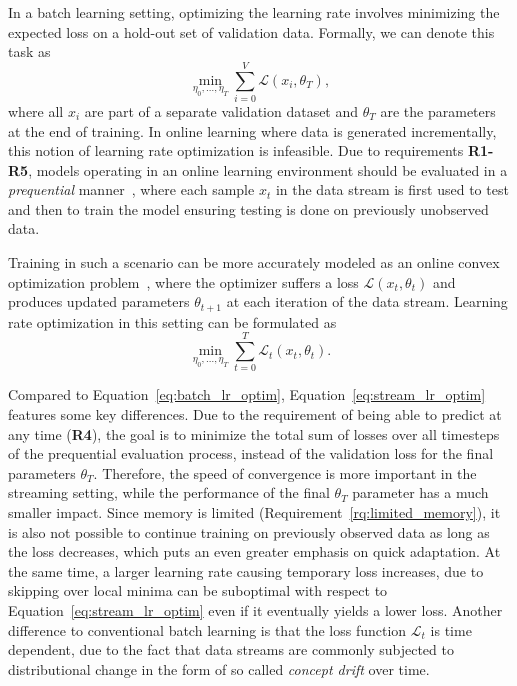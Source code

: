 \documentclass[runningheads]{llncs}
\begin{document}
In a batch learning setting, optimizing the learning rate involves minimizing the expected loss on a hold-out set of validation data.
Formally, we can denote this task as
\begin{equation}
	\label{eq:batch_lr_optim}
	\min_{\eta_0, \ldots, \eta_T} \sum_{i=0}^V \mathcal{L}(x_i, \theta_T),
\end{equation}
where all $x_i$ are part of a separate validation dataset and $\theta_T$ are the parameters at the end of training.
In online learning where data is generated incrementally, this notion of learning rate optimization is infeasible.
Due to requirements \textbf{R1-R5}, models operating in an online learning environment should be evaluated in a \textit{prequential} manner~\cite{bifetMOAMassiveOnline2010}, where each sample $x_t$ in the data stream is first used to test and then to train the model ensuring testing is done on previously unobserved data.

Training in such a scenario can be more accurately modeled as an online convex optimization problem~\cite{shalev-shwartzOnlineLearningOnline2011,hazanIntroductionOnlineConvex2016}, where the optimizer suffers a loss $\mathcal{L}(x_t, \theta_{t})$ and produces updated parameters $\theta_{t+1}$ at each iteration of the data stream.
Learning rate optimization in this setting can be formulated as
\begin{equation}
	\label{eq:stream_lr_optim}
	\min_{\eta_0, \ldots, \eta_T} \sum_{t=0}^{T} \mathcal{L}_t(x_t,\theta_t).
\end{equation}

Compared to Equation~\eqref{eq:batch_lr_optim}, Equation~\eqref{eq:stream_lr_optim} features some key differences.
Due to the requirement of being able to predict at any time (\textbf{R4}), the goal is to minimize the total sum of losses over all timesteps of the prequential evaluation process, instead of the validation loss for the final parameters $\theta_T$.
Therefore, the speed of convergence is more important in the streaming setting, while the performance of the final $\theta_T$ parameter has a much smaller impact.
Since memory is limited (Requirement~\ref{rq:limited_memory}), it is also not possible to continue training on previously observed data as long as the loss decreases, which puts an even greater emphasis on quick adaptation.
At the same time, a larger learning rate causing temporary loss increases, due to skipping over local minima can be suboptimal with respect to Equation~\eqref{eq:stream_lr_optim} even if it eventually yields a lower loss.
Another difference to conventional batch learning is that the loss function $\mathcal{L}_t$ is time dependent, due to the fact that data streams are commonly subjected to distributional change in the form of so called \textit{concept drift} over time.
\end{document}
